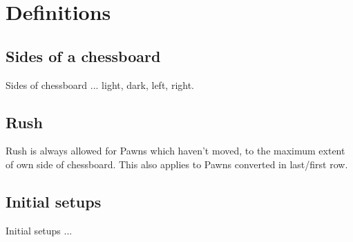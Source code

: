 

\chapter*{Definitions}
\label{ch:Definitions}

\section*{Sides of a chessboard}
\label{sec:Definitions/Sides of a chessboard}

Sides of chessboard ... light, dark, left, right.

\section*{Rush}
\label{sec:Definitions/Rush}

Rush is always allowed for Pawns which haven't moved, to the maximum
extent of own side of chessboard. This also applies to Pawns converted
in last/first row.

\section*{Initial setups}
\label{sec:Definitions/Initial setups}
Initial setups ...




